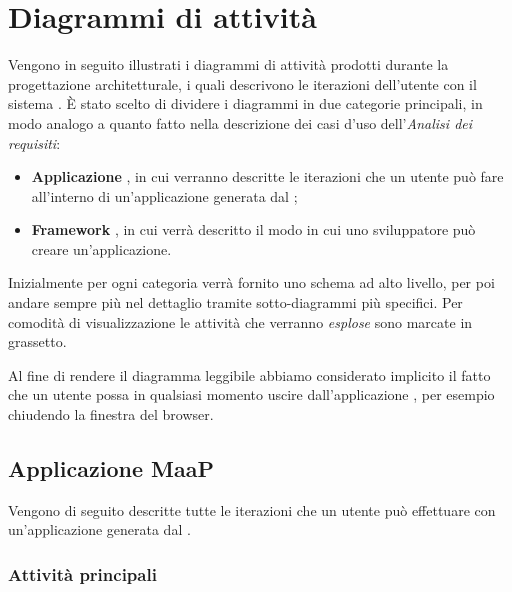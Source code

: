 \section{Diagrammi di attività}

Vengono in seguito illustrati i diagrammi di attività prodotti durante la progettazione architetturale, i quali descrivono le iterazioni dell'utente con il sistema . È stato scelto di dividere i diagrammi in due categorie principali, in modo analogo a quanto fatto nella descrizione dei casi d'uso dell'\textit{Analisi dei requisiti}:

\begin{itemize}

	\item \textbf{Applicazione }, in cui verranno descritte le iterazioni che un utente può fare all'interno di un'applicazione generata dal ;
	\item \textbf{Framework }, in cui verrà descritto il modo in cui uno sviluppatore può creare un'applicazione.

\end{itemize}

Inizialmente per ogni categoria verrà fornito uno schema ad alto livello, per poi andare sempre più nel dettaglio tramite sotto-diagrammi più specifici. Per comodità di visualizzazione le attività che verranno \textit{esplose} sono marcate in grassetto. 

Al fine di rendere il diagramma leggibile abbiamo considerato implicito il fatto che un utente possa in qualsiasi momento uscire dall'applicazione , per esempio chiudendo la finestra del browser.

\subsection{Applicazione MaaP}

Vengono di seguito descritte tutte le iterazioni che un utente può effettuare con un'applicazione generata dal  .


\subsubsection{Attività principali}

